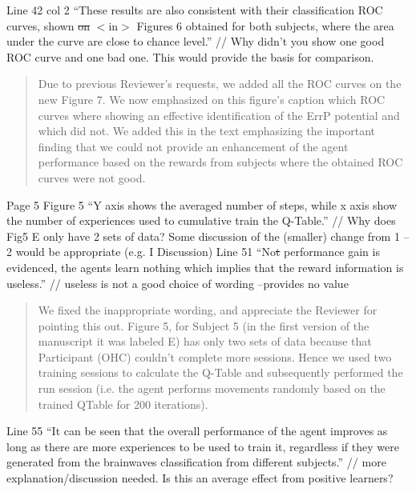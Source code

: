 \documentclass[journal,onecolumn,12pt]{IEEEtran}
\begin{document}
Line 42 col 2 “These results are also consistent with their classification ROC curves, shown \sout{on} $<$in$>$ Figures 6 obtained for both subjects, where the area under the curve are close to chance level.” // Why didn’t you show one good ROC curve and one bad one. This would provide the basis for comparison.

\begin{quotation}
{\color{blue}
Due to previous Reviewer's requests, we added all the ROC curves on the new Figure 7.  We now emphasized on this figure's caption which ROC curves where showing an effective identification of the ErrP potential and which did not.  We added this in the text emphasizing the important finding that we could not provide an enhancement of the agent performance based on the rewards from subjects where the obtained ROC curves were not good.
}
\end{quotation}

Page 5
Figure 5 “Y axis shows the averaged number of steps, while x axis show the number of
experiences used to cumulative train the Q-Table.”
// Why does Fig5 E only have 2 sets of data? Some discussion of the (smaller) change from 1 – 2 would be appropriate (e.g. I Discussion)
Line 51 “No\sout{t} performance gain is evidenced, the agents learn nothing which implies that the reward information is useless.” // useless is not a good choice of wording –provides no value

\begin{quotation}
{\color{blue}
We fixed the inappropriate wording, and appreciate the Reviewer for pointing this out.  
Figure 5, for Subject 5 (in the first version of the manuscript it was labeled E) has only two sets of data because that Participant (OHC) couldn't complete more sessions.  Hence we used two training sessions to calculate the Q-Table and subsequently performed the run session (i.e. the agent performs movements randomly based on the trained QTable for 200 iterations).
}
\end{quotation}

Line 55 “It can be seen that the overall performance of the agent improves as long as there are more experiences to be used to train it, regardless if they were generated from the brainwaves classification from different subjects.” // more explanation/discussion needed. Is this an average effect from positive learners?
\end{document}

